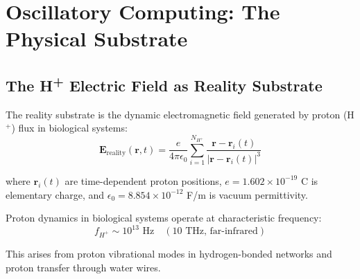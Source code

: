 \section{Oscillatory Computing: The Physical Substrate}

\subsection{The H\textsuperscript{+} Electric Field as Reality Substrate}

\begin{definition}
The reality substrate is the dynamic electromagnetic field generated by proton (H\(^+\)) flux in biological systems:
\begin{equation}
\mathbf{E}_{\text{reality}}(\mathbf{r}, t) = \frac{e}{4\pi\epsilon_0} \sum_{i=1}^{N_{H^+}} \frac{\mathbf{r} - \mathbf{r}_i(t)}{|\mathbf{r} - \mathbf{r}_i(t)|^3}
\end{equation}

where $\mathbf{r}_i(t)$ are time-dependent proton positions, $e = 1.602 \times 10^{-19}$ C is elementary charge, and $\epsilon_0 = 8.854 \times 10^{-12}$ F/m is vacuum permittivity.
\end{definition}

\begin{proposition}
Proton dynamics in biological systems operate at characteristic frequency:
\begin{equation}
f_{H^+} \sim 10^{13} \text{ Hz} \quad (10 \text{ THz, far-infrared})
\end{equation}

This arises from proton vibrational modes in hydrogen-bonded networks and proton transfer through water wires.
\end{proposition}

